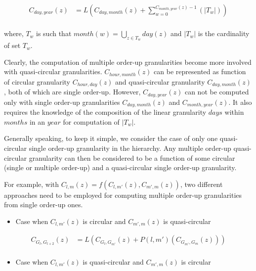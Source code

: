 \documentclass[12pt]{article}
\providecommand{\tightlist}{%
  \setlength{\itemsep}{0pt}\setlength{\parskip}{0pt}}
\begin{document}
\begin{equation} \label{eq:day-year}
\begin{split}
C_{day, year}(z) & = L(C_{day,month}(z) + \sum_{w=0}^{C_{month, year}(z)-1}(\vert T_{w} \vert))\\
\end{split}
\end{equation}

where, \(T_w\) is such that \(month(w) = \bigcup_{z \in T_w}day(z)\) and \(\vert T_w \vert\) is the cardinality of set \(T_w\).

Clearly, the computation of multiple order-up granularities become more involved with quasi-circular granularities. \(C_{hour, month}(z)\) can be represented as function of circular granularity \(C_{hour, day}(z)\) and quasi-circular granularity \(C_{day, month}(z)\), both of which are single order-up. However, \(C_{day, year}(z)\) can not be computed only with single order-up granularities \(C_{day, month}(z)\) and \(C_{month, year}(z)\). It also requires the knowledge of the composition of the linear granularity \(days\) within \(months\) in an \(year\) for computation of \(\vert T_w \vert\).

Generally speaking, to keep it simple, we consider the case of only one quasi-circular single order-up granularity in the hierarchy. Any multiple order-up quasi-circular granularity can then be considered to be a function of some circular (single or multiple order-up) and a quasi-circular single order-up granularity.

For example, with \(C_{l, m}(z) = f(C_{l,m'}(z), C_{m',m}(z))\), two different approaches need to be employed for computing multiple order-up granularities from single order-up ones.

\begin{itemize}
\tightlist
\item
  Case when \(C_{l,m'}(z)\) is circular and \(C_{m',m}(z)\) is quasi-circular
\end{itemize}

\begin{equation} \label{eq:multifromsingle-quasi1}
\begin{split}
C_{G_l,G_{l+2}}(z) & = L(C_{G_{l},G_{m'}}(z) + P(l, m')(C_{G_{m'},G_{m}}(z))) \\ 
\end{split}
\end{equation}

\begin{itemize}
\tightlist
\item
  Case when \(C_{l,m'}(z)\) is quasi-circular and \(C_{m',m}(z)\) is circular
\end{itemize}
\end{document}
